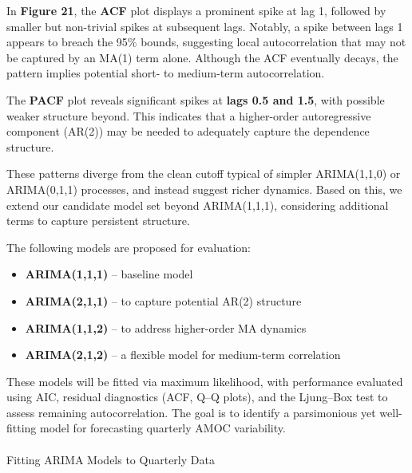 \documentclass[
  11pt,
]{article}
\makeatletter
\let\oldparagraph\paragraph
\renewcommand{\paragraph}{
    \@ifstar
      \xxxParagraphStar
      \xxxParagraphNoStar
  }
\newcommand{\xxxParagraphStar}[1]{\oldparagraph*{#1}\mbox{}}
\newcommand{\xxxParagraphNoStar}[1]{\oldparagraph{#1}\mbox{}}
\makeatother
\begin{document}
In \textbf{Figure 21}, the \textbf{ACF} plot displays a prominent spike
at lag 1, followed by smaller but non-trivial spikes at subsequent lags.
Notably, a spike between lags 1 appears to breach the 95\% bounds,
suggesting local autocorrelation that may not be captured by an MA(1)
term alone. Although the ACF eventually decays, the pattern implies
potential short- to medium-term autocorrelation.

The \textbf{PACF} plot reveals significant spikes at \textbf{lags 0.5
and 1.5}, with possible weaker structure beyond. This indicates that a
higher-order autoregressive component (AR(2)) may be needed to
adequately capture the dependence structure.

These patterns diverge from the clean cutoff typical of simpler
ARIMA(1,1,0) or ARIMA(0,1,1) processes, and instead suggest richer
dynamics. Based on this, we extend our candidate model set beyond
ARIMA(1,1,1), considering additional terms to capture persistent
structure.

The following models are proposed for evaluation:

\begin{itemize}
\item
  \textbf{ARIMA(1,1,1)} -- baseline model
\item
  \textbf{ARIMA(2,1,1)} -- to capture potential AR(2) structure
\item
  \textbf{ARIMA(1,1,2)} -- to address higher-order MA dynamics
\item
  \textbf{ARIMA(2,1,2)} -- a flexible model for medium-term correlation
\end{itemize}

These models will be fitted via maximum likelihood, with performance
evaluated using AIC, residual diagnostics (ACF, Q--Q plots), and the
Ljung--Box test to assess remaining autocorrelation. The goal is to
identify a parsimonious yet well-fitting model for forecasting quarterly
AMOC variability.

\paragraph{Fitting ARIMA Models to Quarterly
Data}\label{fitting-arima-models-to-quarterly-data}
\end{document}
